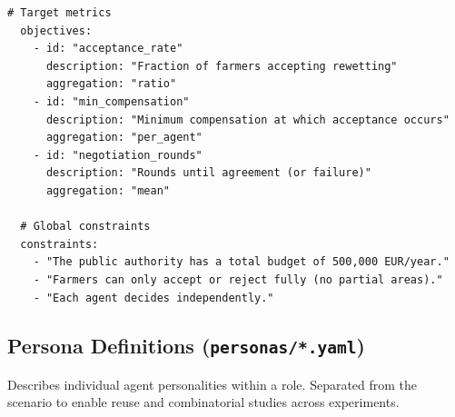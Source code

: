\documentclass[12pt, a4paper]{article}
\begin{document}
\begin{lstlisting}[style=yaml, caption={Scenario definition example: peatland rewetting negotiation.}, label={lst:scenario}]
  # Target metrics
  objectives:
    - id: "acceptance_rate"
      description: "Fraction of farmers accepting rewetting"
      aggregation: "ratio"
    - id: "min_compensation"
      description: "Minimum compensation at which acceptance occurs"
      aggregation: "per_agent"
    - id: "negotiation_rounds"
      description: "Rounds until agreement (or failure)"
      aggregation: "mean"

  # Global constraints
  constraints:
    - "The public authority has a total budget of 500,000 EUR/year."
    - "Farmers can only accept or reject fully (no partial areas)."
    - "Each agent decides independently."
\end{lstlisting}

\subsection{Persona Definitions (\texttt{personas/*.yaml})}

Describes individual agent personalities within a role. Separated from the scenario to enable reuse and combinatorial studies across experiments.
\end{document}
